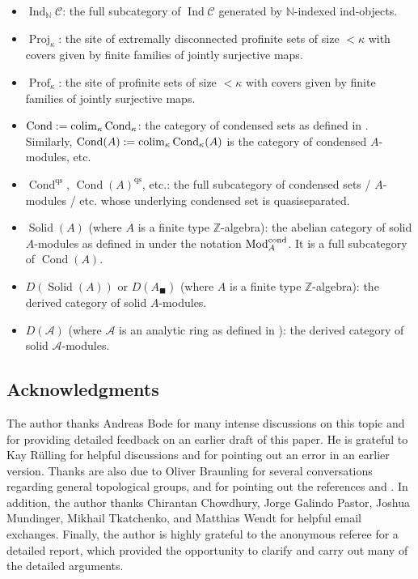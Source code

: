 \documentclass[11pt]{amsart}
\newcommand{\N}{\mathbb{N}}
\newcommand{\Z}{\mathbb{Z}}
\newcommand{\cA}{\mathcal{A}} %
\newcommand{\cC}{\mathcal{C}} %
\newcommand{\Mod}{\operatorname{Mod}}
\newcommand{\bbox}{{\blacksquare}}
\newcommand{\Prof}{\operatorname{Prof}}
\newcommand{\qs}{\operatorname{qs}}
\renewcommand{\lim}{\operatornamewithlimits{\rm{lim}}}
\newcommand{\colim}{\operatornamewithlimits{\rm{colim}}}
\newcommand{\Proj}{\operatorname{Proj}}
\newcommand{\Cond}{\operatorname{Cond}}
\newcommand{\Solid}{\operatorname{Solid}}
\newcommand{\Ind}{\operatorname{Ind}}
\theoremstyle{plain}
\theoremstyle{definition}
\numberwithin{equation}{prop}
\begin{document}
\begin{itemize}
\item 
$\Ind_\N\cC$: the full subcategory of $\Ind\cC$ generated by $\N$-indexed ind-objects.
\item 
$\Proj_\kappa$: the site of extremally  disconnected profinite sets of size $<\kappa$ with covers given by finite families of jointly surjective maps. 
\item 
$\Prof_\kappa$: the site of profinite sets of size $<\kappa$ with covers given by finite families of jointly surjective maps. 
\item 
$\Cond:=\colim_\kappa \Cond_\kappa$: the category of condensed sets as defined in \cite[p. 15]{CS}.
Similarly, 
$\Cond(A):=\colim_\kappa \Cond_\kappa(A)$ is the category of condensed $A$-modules, etc.
\item 
$\Cond^{\qs}$, $\Cond(A)^{\qs}$, etc.: the full subcategory of condensed sets / $A$-modules / etc.  whose underlying condensed set is quasiseparated.
\item 
$\Solid(A)$ (where $A$ is a finite type $\Z$-algebra): the abelian category of solid $A$-modules as defined in \cite[Proposition 7.5(i)]{CS} under the notation $\Mod_A^{\rm cond}$. It is a full subcategory of $\Cond(A)$.
\item 
$D(\Solid(A))$ or $D(A_\bbox)$ (where $A$ is a finite type $\Z$-algebra): the derived category of solid $A$-modules.
\item 
$D(\cA)$ (where $\cA$ is an analytic ring as defined in \cite[Definition 7.4]{CS}): the derived category of solid $\cA$-modules.
\end{itemize}

\subsection{Acknowledgments}
The author thanks Andreas Bode for many intense discussions on this topic and for providing detailed feedback on an earlier draft of this paper.
He is grateful to Kay Rülling for helpful discussions and for pointing out an error in an earlier version.
Thanks are also due to Oliver Braunling for several conversations regarding general topological groups, and for pointing out the references \cite{Prosmans} and \cite{Wilson}.
In addition, the author thanks Chirantan Chowdhury, Jorge Galindo Pastor, Joshua Mundinger, Mikhail Tkatchenko, and Matthias Wendt for helpful email exchanges.
Finally, the author is highly grateful to the anonymous referee for a detailed report, which provided the opportunity to clarify and carry out many of the detailed arguments.
\end{document}
